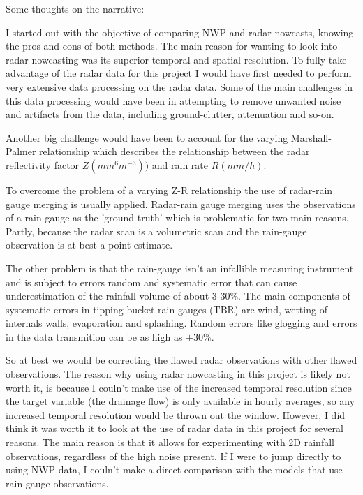 Some thoughts on the narrative:

I started out with the objective of comparing NWP and radar nowcasts, knowing the pros and cons of both methods. The main reason for wanting to look into radar nowcasting was its superior temporal and spatial resolution. To fully take advantage of the radar data for this project I would have first needed to perform very extensive data processing on the radar data. Some of the main challenges in this data processing would have been in attempting to remove unwanted noise and artifacts from the data, including ground-clutter, attenuation and so-on.

Another big challenge would have been to account for the varying Marshall-Palmer relationship which describes the relationship between the radar reflectivity factor $Z (mm^6 m^{-3}))$ and rain rate $R(mm/h)$. 

To overcome the problem of a varying Z-R relationship the use of radar-rain gauge merging is usually applied. Radar-rain gauge merging uses the observations of a rain-gauge as the 'ground-truth' which is problematic for two main reasons. Partly, because the radar scan is a volumetric scan and the rain-gauge observation is at best a point-estimate. 

The other problem is that the rain-gauge isn't an infallible measuring instrument and is subject to errors random and systematic error that can cause underestimation of the rainfall volume of about 3-30\%. The main components of systematic errors in tipping bucket rain-gauges (TBR) are wind, wetting of internals walls, evaporation and splashing. Random errors like glogging and errors in the data transmition can be as high as $\pm30\%$. 

So at best we would be correcting the flawed radar observations with other flawed observations. The reason why using radar nowcasting in this project is likely not worth it, is because I couln't make use of the increased temporal resolution since the target variable (the drainage flow) is only available in hourly averages, so any increased temporal resolution would be thrown out the window. However, I did think it was worth it to look at the use of radar data in this project for several reasons. The main reason is that it allows for experimenting with 2D rainfall observations, regardless of the high noise present. If I were to jump directly to using NWP data, I couln't make a direct comparison with the models that use rain-gauge observations. 

